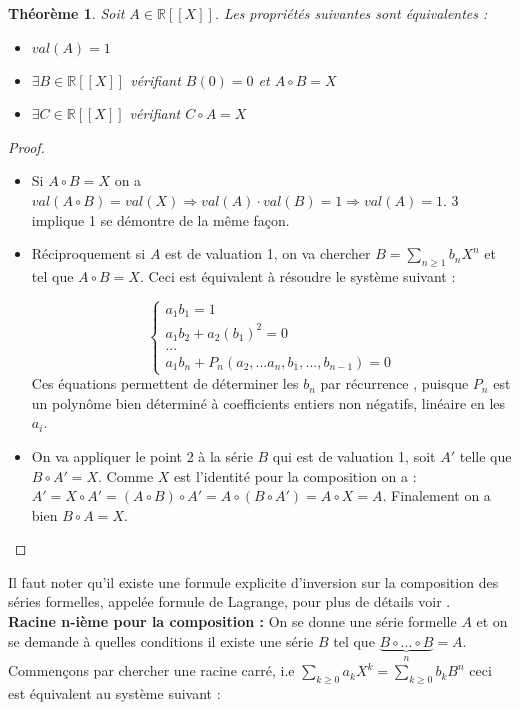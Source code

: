\documentclass[12pt,a4paper]{amsart}
\newtheorem{thm}{\bf Th\'eor\`eme}
\begin{document}
\begin{thm}
Soit $A\in \mathbb{R}[[X]]$. Les propriétés suivantes sont équivalentes : 
\begin{itemize}
\item[1] $val(A)=1$ 
\item[2] $\exists B \in \mathbb{R}[[X]]$ vérifiant $B(0)=0$ et $A \circ B =X$ 
\item[3] $\exists C \in \mathbb{R}[[X]]$ vérifiant  $C \circ A =X$ 
\end{itemize}
\end{thm}

\begin{proof}
\begin{itemize}
\item[2$\Rightarrow$1 :] Si $A \circ B = X $ on a $val(A \circ B ) = val(X) \Rightarrow val(A) \cdot val(B)=1 \Rightarrow val(A) =1$. 3 implique 1 se démontre de la même façon. 
\item[1$\Rightarrow$2 :] Réciproquement si $A$ est de valuation 1, on va chercher $B= \sum_{n \geq 1} b_{n} X^{n}$ et tel que $A \circ B =X$. Ceci est équivalent à résoudre le système suivant : 

$$ \left\{
	\begin{array}{ll}
	a_{1}b_{1}=1 \\
	a_{1}b_{2}+a_{2}(b_{1})^{2}=0\\
	...\\
	a_{1}b_{n}+ P_{n}(a_{2},...a_{n},b_{1},...,b_{n-1})=0
	\end{array}
\right.
$$
Ces équations permettent de déterminer les $b_{n}$ par récurrence , puisque $P_{n}$ est un polynôme bien déterminé à coefficients entiers non négatifs, linéaire en les $a_{i}$. 

\item[ 2 $\Rightarrow$ 3 :] On va appliquer le point 2 à la série $B$ qui est de valuation 1, soit $A'$ telle que $B \circ A'=X$. Comme $X$ est l'identité pour la composition on a : $A'=X \circ A'=(A\circ B)\circ A'=A\circ(B\circ A')=A\circ X=A$. Finalement on a bien $B\circ A= X$. 
\end{itemize}

\end{proof}

Il faut noter qu'il existe une formule explicite d'inversion sur la composition des séries formelles, appelée formule de Lagrange, pour plus de détails voir \cite{Lagrange}. \\

\textbf{Racine n-ième pour la composition : }On se donne une série formelle $A$ et on se demande à quelles conditions il existe une série $B$ tel que $\underbrace{B\circ ...\circ B}_{n}=A$. Commençons par chercher une racine carré, i.e $ \sum_{k\geq 0} a_{k}X^{k}= \sum_{k \geq 0} b_{k} B^{n}$ ceci est équivalent au système suivant : 
\end{document}
